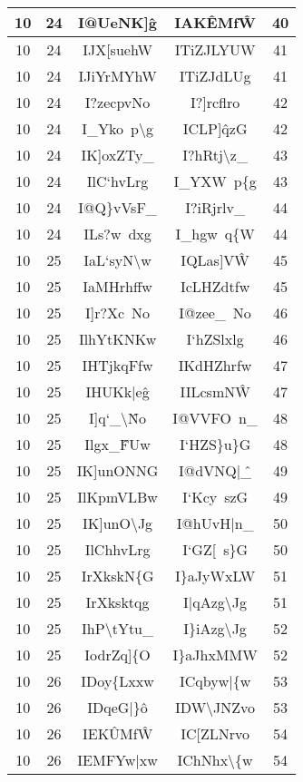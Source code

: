 \begin{longtable}{ | c | c || c | c | c | }
10 & 24 & I@UeNK]\^g & IAK\^EMf\^W & 40 \\
\hline
10 & 24 & IJX[suehW & ITiZJLYUW & 41 \\
10 & 24 & IJiYrMYhW & ITiZJdLUg & 41 \\
\hline
10 & 24 & I?zecpvNo & I?]rcflro & 42 \\
10 & 24 & I\_Yko~p\textbackslash g & ICLP]\^qzG & 42 \\
\hline
10 & 24 & IK]oxZTy\_ & I?hRtj\textbackslash z\_ & 43 \\
10 & 24 & IlC`hvLrg & I\_YXW~p\{g & 43 \\
\hline
10 & 24 & I@Q\}vVsF\_ & I?iRjrlv\_ & 44 \\
10 & 24 & ILs?w~dxg & I\_hgw~q\{W & 44 \\
\hline
\hline
10 & 25 & IaL`syN\textbackslash w & IQLas]V\^W & 45 \\
10 & 25 & IaMHrhffw & IcLHZdtfw & 45 \\
\hline
10 & 25 & I]r?Xc~No & I@zee\_~No & 46 \\
10 & 25 & IlhYtKNKw & I`hZSlxlg & 46 \\
\hline
10 & 25 & IHTjkqFfw & IKdHZhrfw & 47 \\
10 & 25 & IHUKk|e\^g & IILcsmN\^W & 47 \\
\hline
10 & 25 & I]q`\_\textbackslash \^No & I@VVFO~n\_ & 48 \\
10 & 25 & Ilgx\_\^FUw & I`HZS\}u\}G & 48 \\
\hline
10 & 25 & IK]unONNG & I@dVNQ|\^\_ & 49 \\
10 & 25 & IlKpmVLBw & I`Kcy~szG & 49 \\
\hline
10 & 25 & IK]unO\textbackslash Jg & I@hUvH|n\_ & 50 \\
10 & 25 & IlChhvLrg & I`GZ[~s\}G & 50 \\
\hline
10 & 25 & IrXkskN\{G & I\}aJyWxLW & 51 \\
10 & 25 & IrXksktqg & I|qAzg\textbackslash Jg & 51 \\
\hline
10 & 25 & IhP\textbackslash tYtu\_ & I\}iAzg\textbackslash Jg & 52 \\
10 & 25 & IodrZq]\{O & I\}aJhxMMW & 52 \\
\hline
\hline
10 & 26 & IDoy\{Lxxw & ICqbyw|\{w & 53 \\
10 & 26 & IDqeG|\}\^o & IDW\textbackslash JNZvo & 53 \\
\hline
10 & 26 & IEK\^UMf\^W & IC[ZLNrvo & 54 \\
10 & 26 & IEMFYw|xw & IChNhx\textbackslash \{w & 54 \\

\end{longtable}
